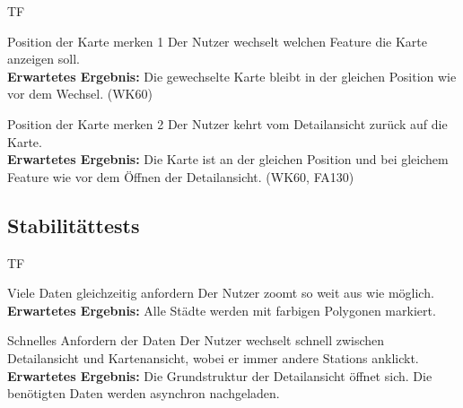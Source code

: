 \begin{Kriterien}{TF}
	\item[Position der Karte merken 1] Der Nutzer wechselt welchen Feature die Karte anzeigen soll. \\ 
	\textbf{Erwartetes Ergebnis:} Die gewechselte Karte bleibt in der gleichen Position wie vor dem Wechsel. (WK60)
	
	\item[Position der Karte merken 2] Der Nutzer kehrt vom Detailansicht zurück auf die Karte. \\ 
	\textbf{Erwartetes Ergebnis:} Die Karte ist an der gleichen Position und bei gleichem Feature wie vor dem Öffnen der \gls{Detailansicht}. (WK60, FA130)
	
\end{Kriterien}
\subsection{Stabilitättests}
\begin{Kriterien}{TF}

	\item[Viele Daten gleichzeitig anfordern] Der Nutzer zoomt so weit aus wie möglich.\\ \textbf{Erwartetes Ergebnis:} Alle Städte werden mit farbigen Polygonen markiert.

	\item[Schnelles Anfordern der Daten] Der Nutzer wechselt schnell zwischen Detailansicht und Kartenansicht, wobei er immer andere \glspl{Station} anklickt. \\ \textbf{Erwartetes Ergebnis:} Die Grundstruktur der Detailansicht öffnet sich. 
	Die benötigten Daten werden asynchron nachgeladen.

\end{Kriterien}
